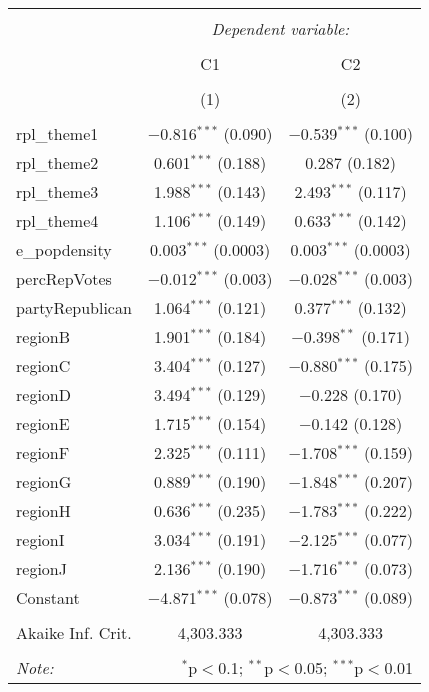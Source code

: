 
\begin{table}[!htbp] \centering 
  \caption{} 
  \label{} 
\begin{tabular}{@{\extracolsep{5pt}}lcc} 
\\[-1.8ex]\hline 
\hline \\[-1.8ex] 
 & \multicolumn{2}{c}{\textit{Dependent variable:}} \\ 
\cline{2-3} 
\\[-1.8ex] & C1 & C2 \\ 
\\[-1.8ex] & (1) & (2)\\ 
\hline \\[-1.8ex] 
 rpl\_theme1 & $-$0.816$^{***}$ (0.090) & $-$0.539$^{***}$ (0.100) \\ 
  rpl\_theme2 & 0.601$^{***}$ (0.188) & 0.287 (0.182) \\ 
  rpl\_theme3 & 1.988$^{***}$ (0.143) & 2.493$^{***}$ (0.117) \\ 
  rpl\_theme4 & 1.106$^{***}$ (0.149) & 0.633$^{***}$ (0.142) \\ 
  e\_popdensity & 0.003$^{***}$ (0.0003) & 0.003$^{***}$ (0.0003) \\ 
  percRepVotes & $-$0.012$^{***}$ (0.003) & $-$0.028$^{***}$ (0.003) \\ 
  partyRepublican & 1.064$^{***}$ (0.121) & 0.377$^{***}$ (0.132) \\ 
  regionB & 1.901$^{***}$ (0.184) & $-$0.398$^{**}$ (0.171) \\ 
  regionC & 3.404$^{***}$ (0.127) & $-$0.880$^{***}$ (0.175) \\ 
  regionD & 3.494$^{***}$ (0.129) & $-$0.228 (0.170) \\ 
  regionE & 1.715$^{***}$ (0.154) & $-$0.142 (0.128) \\ 
  regionF & 2.325$^{***}$ (0.111) & $-$1.708$^{***}$ (0.159) \\ 
  regionG & 0.889$^{***}$ (0.190) & $-$1.848$^{***}$ (0.207) \\ 
  regionH & 0.636$^{***}$ (0.235) & $-$1.783$^{***}$ (0.222) \\ 
  regionI & 3.034$^{***}$ (0.191) & $-$2.125$^{***}$ (0.077) \\ 
  regionJ & 2.136$^{***}$ (0.190) & $-$1.716$^{***}$ (0.073) \\ 
  Constant & $-$4.871$^{***}$ (0.078) & $-$0.873$^{***}$ (0.089) \\ 
 \hline \\[-1.8ex] 
Akaike Inf. Crit. & 4,303.333 & 4,303.333 \\ 
\hline 
\hline \\[-1.8ex] 
\textit{Note:}  & \multicolumn{2}{r}{$^{*}$p$<$0.1; $^{**}$p$<$0.05; $^{***}$p$<$0.01} \\ 
\end{tabular} 
\end{table} 
